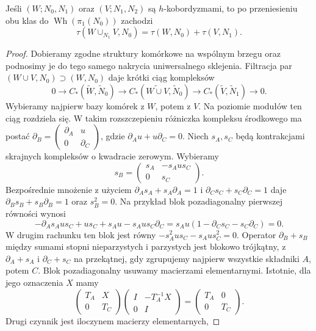 \begin{lemat}
\label{lem:add-torsja-20}
Jeśli $(W;N_0,N_1)$ oraz $(V;N_1,N_2)$ są
$h$-kobordyzmami, to po przeniesieniu obu klas
do $\operatorname{Wh}(\pi_1(N_0))$ zachodzi
\[
 \tau(W\cup_{N_1}V,N_0)
 =\tau(W,N_0)+\tau(V,N_1).
\]
\end{lemat}
\begin{proof}
Dobieramy zgodne struktury komórkowe na wspólnym
brzegu oraz podnosimy je do tego samego nakrycia
uniwersalnego sklejenia. Filtracja par
$(W\cup V,N_0)\supset(W,N_0)$ daje krótki ciąg
kompleksów
\[
 0\to C_*(\widetilde W,\widetilde N_0)
 \to C_*(\widetilde{W\cup V},\widetilde N_0)
 \to C_*(\widetilde V,\widetilde N_1)\to0.
\]
Wybieramy najpierw bazy komórek z $W$, potem
z $V$. Na poziomie modułów ten ciąg rozdziela się.
W takim rozszczepieniu różniczka kompleksu
środkowego ma postać
$\partial_B=\left(\begin{smallmatrix}\partial_A&u\\0&\partial_C\end{smallmatrix}\right)$,
gdzie $\partial_Au+u\partial_C=0$. Niech $s_A,s_C$ będą
kontrakcjami skrajnych kompleksów o kwadracie
zerowym. Wybieramy
\[
 s_B=\begin{pmatrix}
 s_A&-s_Au s_C\\0&s_C
 \end{pmatrix}.
\]
Bezpośrednie mnożenie z użyciem
$\partial_As_A+s_A\partial_A=1$ i
$\partial_Cs_C+s_C\partial_C=1$
daje $\partial_Bs_B+s_B\partial_B=1$ oraz $s_B^2=0$.
Na przykład blok pozadiagonalny pierwszej równości wynosi
\[
 -\partial_As_Aus_C+us_C+s_Au-s_Aus_C\partial_C
 =s_Au(1-\partial_Cs_C-s_C\partial_C)=0.
\]
W drugim rachunku ten blok jest równy
$-s_A^2us_C-s_Aus_C^2=0$.
Operator $\partial_B+s_B$ między sumami stopni
nieparzystych i parzystych jest blokowo
trójkątny, z $\partial_A+s_A$ i $\partial_C+s_C$ na przekątnej,
gdy zgrupujemy najpierw wszystkie składniki $A$, potem $C$.
Blok pozadiagonalny usuwamy macierzami
elementarnymi. Istotnie, dla jego oznaczenia $X$ mamy
\[
 \begin{pmatrix}T_A&X\\0&T_C\end{pmatrix}
 \begin{pmatrix}I&-T_A^{-1}X\\0&I\end{pmatrix}
 =\begin{pmatrix}T_A&0\\0&T_C\end{pmatrix}.
\]
Drugi czynnik jest iloczynem macierzy elementarnych,

\end{proof}
